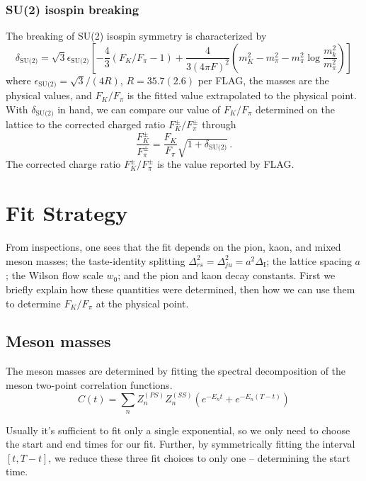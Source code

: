 \documentclass[prd,tightenlines,preprintnumbers,showpacs,superscriptaddress,notitlepage,eqsecnum,floatfix,notitlepage]{revtex4-1}
\begin{document}
\subsubsection{ SU(2) isospin breaking}
The breaking of SU(2) isospin symmetry is characterized by
\begin{equation}
\delta_{\text{SU(2)}} = \sqrt{3} \epsilon_\text{SU(2)} \left[
-\frac43 (F_K / F_\pi-1)
+\frac{4}{3(4 \pi F)^2} \left( m_K^2 - m_\pi^2 -m_\pi^2 \log \frac{m_k^2}{m_\pi^2} \right)
\right]
\end{equation}
where $\epsilon_\text{SU(2)} = \sqrt{3}/(4R)$, $R=35.7(2.6)$ per FLAG, the masses are the physical values, and $F_K/F_\pi$ is the fitted value extrapolated to the physical point. With $\delta_{\text{SU(2)}}$ in hand, we can compare our value of $F_K/F_\pi$ determined on the lattice to the corrected charged ratio $F^\pm_K/F^\pm_\pi$ through
\begin{equation}
\frac{F^\pm_K}{F^\pm_\pi} = \frac{F_K}{F_\pi} \sqrt{1+ \delta_{\text{SU(2)}}} \, .
\end{equation}
The corrected charge ratio $F^\pm_K/F^\pm_\pi$ is the value reported by FLAG.

\section{Fit Strategy}

From inspections, one sees that the fit depends on the pion, kaon, and mixed meson masses; the taste-identity splitting $\Delta_{rs}^2 = \Delta_{ju}^2 = a^2 \Delta_\text{I}$; the lattice spacing $a$; the Wilson flow scale $w_0$; and the pion and kaon decay constants. First we briefly explain how these quantities were determined, then how we can use them to determine $F_K / F_\pi$ at the physical point.


\subsection{Meson masses}
The meson masses are determined by fitting the spectral decomposition of the meson two-point correlation functions.
\begin{equation}
C(t) = \sum_n Z^{(PS)}_{n} Z^{(SS)}_{n} \left( e^{-E_n t} + e^{-E_n (T-t)} \right)
\label{eqn:meson-correlation-fcn}
\end{equation}

Usually it's sufficient to fit only a single exponential, so we only need to choose the start and end times for our fit. Further, by symmetrically fitting the interval $[t, T - t]$, we reduce these three fit choices to only one -- determining the start time.
\end{document}
